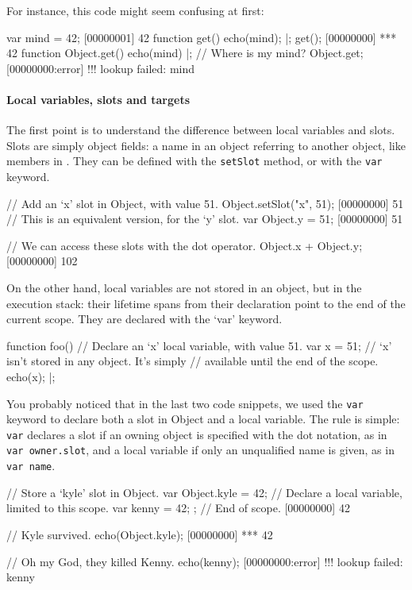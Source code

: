 For instance, this code might seem confusing at first:

\begin{urbiscript}
var mind = 42;
[00000001] 42
function get()
{
  echo(mind);
}|;
get();
[00000000] *** 42
function Object.get()
{
  echo(mind)
}|;
// Where is my mind?
Object.get;
[00000000:error] !!! lookup failed: mind
\end{urbiscript}

\paragraph{Local variables, slots and targets}
The first point is to understand the difference between local
variables and slots. Slots are simply object fields: a name in an
object referring to another object, like members in \Cxx. They can be
defined with the \lstinline|setSlot| method, or with the
\lstinline|var| keyword.

\begin{urbiscript}
// Add an `x' slot in Object, with value 51.
Object.setSlot("x", 51);
[00000000] 51
// This is an equivalent version, for the `y' slot.
var Object.y = 51;
[00000000] 51

// We can access these slots with the dot operator.
Object.x + Object.y;
[00000000] 102
\end{urbiscript}

On the other hand, local variables are not stored in an object, but in
the execution stack: their lifetime spans from their declaration point
to the end of the current scope. They are declared with the `var'
keyword.

\begin{urbiscript}
function foo()
{
  // Declare an `x' local variable, with value 51.
  var x = 51;
  // `x' isn't stored in any object. It's simply
  // available until the end of the scope.
  echo(x);
}|;
\end{urbiscript}

You probably noticed that in the last two code snippets, we used the
\lstinline|var| keyword to declare both a slot in Object and a local
variable. The rule is simple: \lstinline|var| declares a slot if an
owning object is specified with the dot notation, as in %
\lstinline|var owner.slot|, and a local variable if only an
unqualified name is given, as in \lstinline|var name|.

\begin{urbiscript}
{
  // Store a `kyle' slot in Object.
  var Object.kyle = 42;
  // Declare a local variable, limited to this scope.
  var kenny = 42;
}; // End of scope.
[00000000] 42

// Kyle survived.
echo(Object.kyle);
[00000000] *** 42

// Oh my God, they killed Kenny.
echo(kenny);
[00000000:error] !!! lookup failed: kenny
\end{urbiscript}


